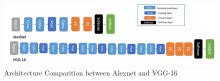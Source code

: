 \begin{figure}[ht]
\begin{center}
\includegraphics[width=1\columnwidth]{Image/alexvgg.PNG}
\caption[CNNpic1]{ Architecture Comparition between Alexnet and VGG-16  \cite{CNNpic}}
\label{fig:BoxesAndArrowsAreNice}
\end{center}
\end{figure}